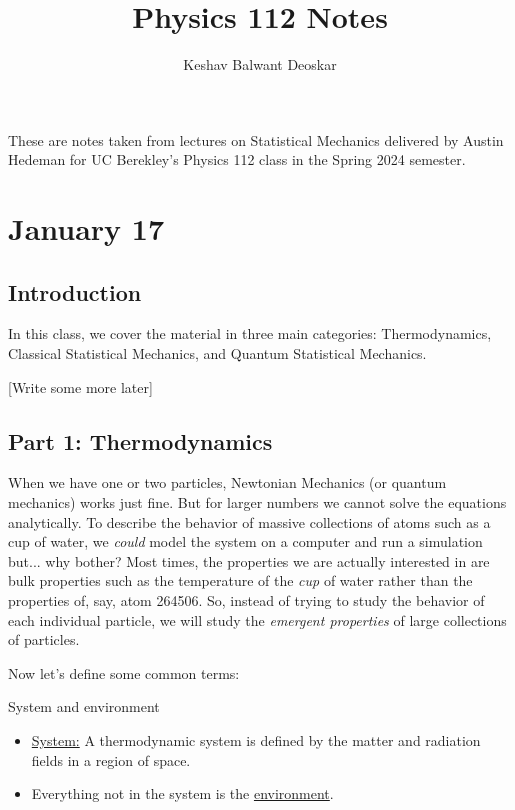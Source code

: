 \documentclass{article}
\title{Physics 112 Notes}
\author{Keshav Balwant Deoskar}
\begin{document}
\maketitle

These are notes taken from lectures on Statistical Mechanics delivered by Austin Hedeman for UC Berekley's Physics 112 class in the Spring 2024 semester.

\tableofcontents

\pagebreak
\section{January 17}
\vskip 0.5cm
\subsection{Introduction}

In this class, we cover the material in three main categories: Thermodynamics, Classical Statistical Mechanics, and Quantum Statistical Mechanics.

[Write some more later]
\vskip 1cm

\subsection{Part 1: Thermodynamics}
When we have one or two particles, Newtonian Mechanics (or quantum mechanics) works just fine. But for larger numbers we cannot solve the equations analytically. To describe the behavior of massive collections of atoms such as a cup of water, we \emph{could} model the system on a computer and run a simulation but... why bother? Most times, the properties we are actually interested in are bulk properties such as the temperature of the \emph{cup} of water rather than the properties of, say, atom 264506. So, instead of trying to study the behavior of each individual particle, we will study the \emph{emergent properties} of large collections of particles.

\vskip 0.5cm

Now let's define some common terms:
\begin{mathdefinitionbox}{System and environment}
  \begin{itemize}
    \item \underline{System:} A thermodynamic system is defined by the matter and radiation fields in a region of space.
    \item Everything not in the system is the \underline{environment}.
  \end{itemize}
\end{mathdefinitionbox}
\end{document}
